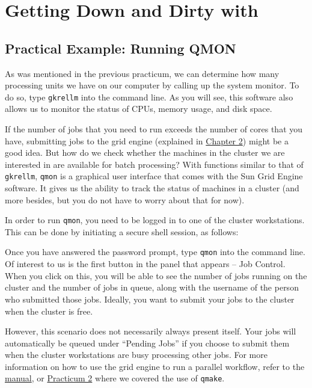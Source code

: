 \chapter{Getting Down and Dirty with \maken{}}
\label{sec:practicum3}

\section{Practical Example: Running QMON}
As was mentioned in the previous practicum, we can determine how many processing units we have on our computer by calling up the system monitor. To do so, type \texttt{gkrellm} into the command line. As you will see, this software also allows us to monitor the status of CPUs, memory usage, and disk space. 

If the number of jobs that you need to run exceeds the number of cores that you have, submitting jobs to the grid engine (explained in \hyperref[sec:gridengine]{Chapter 2}) might be a good idea. But how do we check whether the machines in the cluster we are interested in are available for batch processing? With functions similar to that of \texttt{gkrellm}, \texttt{qmon} is a graphical user interface that comes with the Sun Grid Engine software. It gives us the ability to track the status of machines in a cluster (and more besides, but you do not have to worry about that for now). 

In order to run \texttt{qmon}, you need to be logged in to one of the cluster workstations. This can be done by initiating a secure shell session, as follows:

Once you have answered the password prompt, type \texttt{qmon} into the command line. Of interest to us is the first button in the panel that appears -- Job Control. When you click on this, you will be able to see the number of jobs running on the cluster and the number of jobs in queue, along with the username of the person who submitted those jobs. Ideally, you want to submit your jobs to the cluster when the cluster is free. 

However, this scenario does not necessarily always present itself. Your jobs will automatically be queued under ``Pending Jobs'' if you choose to submit them when the cluster workstations are busy processing other jobs. For more information on how to use the grid engine to run a parallel \maken{} workflow, refer to the \hyperref[sec:gridengine]{manual}, or \hyperref[sec:practicum2]{Practicum 2} where we covered the use of \texttt{qmake}. 

